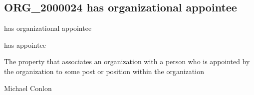 \documentclass[letterpaper,10pt,english]{sphinxmanual}
\begin{document}
\subsection{ORG\_2000024 \sphinxhyphen{} has organizational appointee}
\label{\detokenize{doc-ORG_2000024:org-2000024-has-organizational-appointee}}\label{\detokenize{doc-ORG_2000024:index-0}}\label{\detokenize{doc-ORG_2000024::doc}}
\begin{sphinxShadowBox}

\sphinxAtStartPar
has organizational appointee
\end{sphinxShadowBox}

\begin{sphinxShadowBox}

\sphinxAtStartPar
has appointee
\end{sphinxShadowBox}

\begin{sphinxShadowBox}

\sphinxAtStartPar
{}
\end{sphinxShadowBox}

\begin{sphinxShadowBox}

\sphinxAtStartPar
The property that associates an organization with a person who is appointed by the organization to some post or position within the organization
\end{sphinxShadowBox}

\begin{sphinxShadowBox}

\sphinxAtStartPar
Michael Conlon 
\end{sphinxShadowBox}

\begin{sphinxShadowBox}

\sphinxAtStartPar
{\hyperref[\detokenize{doc-ORG_0000001::doc}]{}}
\end{sphinxShadowBox}

\begin{sphinxShadowBox}

\sphinxAtStartPar
{\hyperref[\detokenize{doc-NCBITaxon_9606::doc}]{}}
\end{sphinxShadowBox}
\end{document}
